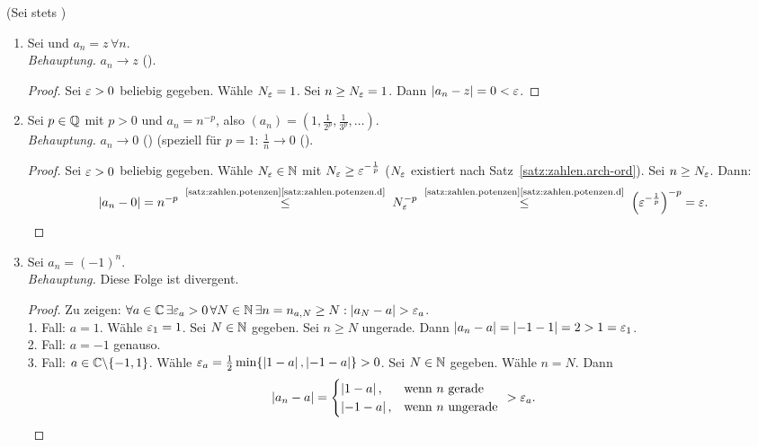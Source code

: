 \documentclass[12pt]{scrreprt}
\begin{document}
\begin{bsp}
\label{bsp:konv.konv}
(Sei stets )
\begin{enumerate}
\item Sei  und $a_n = z \,\forall n$.\\
\emph{Behauptung.} $a_n\to z$ (\ninf).
\begin{proof} Sei $\varepsilon>0$ beliebig gegeben. Wähle $N_\varepsilon=1$. Sei $n \ge N_\varepsilon=1$. Dann $\left\lvert a_n-z\right\lvert=0<\varepsilon$. \end{proof}
\item Sei $p\in\mathbb{Q}$ mit $p>0$ und $a_n=n^{-p}$, also $(a_n)=(1,\frac{1}{2^p},\frac{1}{3^p}, \ldots)$.\\
\emph{Behauptung.} $a_n\to0$ (\ninf) (speziell für $p=1$: $\frac{1}{n}\to0$ (\ninf).
\begin{proof} Sei $\varepsilon>0$ beliebig gegeben. Wähle $N_\varepsilon\in\mathbb{N}$ mit $N_\varepsilon\ge\varepsilon^{-\frac{1}{p}}$ ($N_\varepsilon$ existiert nach Satz~\ref{satz:zahlen.arch-ord}). Sei $n\ge N_\varepsilon$. Dann:
\[\abs{a_n-0}=n^{-p} \nach{\le}{\ref{satz:zahlen.potenzen}\ref{satz:zahlen.potenzen.d}} N_\ep^{-p} \nach{\le}{\ref{satz:zahlen.potenzen}\ref{satz:zahlen.potenzen.d}} \left(\ep^{-\frac{1}{p}}\right)^{-p}=\ep.\]
\end{proof}
\item Sei $a_n=(-1)^n$.\\
\emph{Behauptung.} Diese Folge ist divergent.
\begin{proof} Zu zeigen: $\forall a\in\mathbb{C}\,\exists \varepsilon_a>0 \,\forall N\in\mathbb{N} \,\exists n=n_{a,N}\ge N: \left\lvert a_N-a\right\lvert>\varepsilon_a$.\\
1. Fall: $a=1$. Wähle $\varepsilon_1=1$. Sei $N\in\mathbb{N}$ gegeben. Sei $n \ge N$ ungerade. Dann $\left\lvert a_n-a\right\lvert=\left\lvert-1-1\right\lvert=2>1=\varepsilon_1$.\\
2. Fall: $a=-1$ genauso.\\
3. Fall: $a\in\mathbb{C}\backslash\{-1,1\}$. Wähle $\varepsilon_a=\frac12\min\{\left\lvert1-a\right\lvert,\left\lvert-1-a\right\lvert\}>0$. Sei $N\in\mathbb{N}$ gegeben. Wähle $n=N$. Dann \[\left\lvert a_n-a\right\lvert=\begin{cases} \left\lvert1-a\right\lvert, & \text{wenn }n\text{ gerade}\\ \left\lvert-1-a\right\lvert, & \text{wenn }n\text{ ungerade} \end{cases}\ >\varepsilon_a.\] \end{proof}
\end{enumerate}
\end{bsp}
\end{document}
